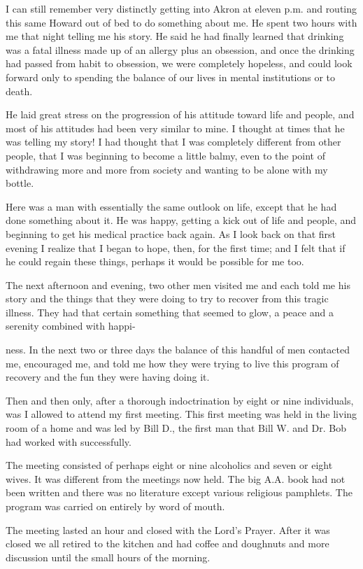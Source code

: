 \begin{biblechapter}
I can still remember very distinctly getting into Akron at eleven p.m. and routing this same Howard out of bed to do something about me. He spent two hours with me that night telling me his story. He said he had finally learned that drinking was a fatal illness made up of an allergy plus an obsession, and once the drinking had passed from habit to obsession, we were completely hopeless, and could look forward only to spending the balance of our lives in mental institutions or to death.

He laid great stress on the progression of his attitude toward life and people, and most of his attitudes had been very similar to mine. I thought at times that he was telling my story! I had thought that I was completely different from other people, that I was beginning to become a little balmy, even to the point of withdrawing more and more from society and wanting to be alone with my bottle.

Here was a man with essentially the same outlook on life, except that he had done something about it. He was happy, getting a kick out of life and people, and beginning to get his medical practice back again. As I look back on that first evening I realize that I began to hope, then, for the first time; and I felt that if he could regain these things, perhaps it would be possible for me too.

The next afternoon and evening, two other men visited me and each told me his story and the things that they were doing to try to recover from this tragic illness. They had that certain something that seemed to glow, a peace and a serenity combined with happi-

ness. In the next two or three days the balance of this handful of men contacted me, encouraged me, and told me how they were trying to live this program of recovery and the fun they were having doing it.

Then and then only, after a thorough indoctrination by eight or nine individuals, was I allowed to attend my first meeting. This first meeting was held in the living room of a home and was led by Bill D., the first man that Bill W. and Dr. Bob had worked with successfully.

The meeting consisted of perhaps eight or nine alcoholics and seven or eight wives. It was different from the meetings now held. The big A.A. book had not been written and there was no literature except various religious pamphlets. The program was carried on entirely by word of mouth.

The meeting lasted an hour and closed with the Lord’s Prayer. After it was closed we all retired to the kitchen and had coffee and doughnuts and more discussion until the small hours of the morning.


\end{biblechapter}
